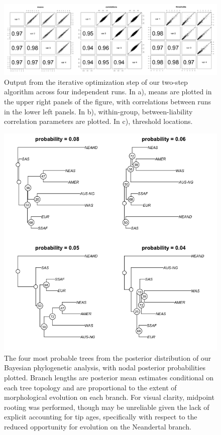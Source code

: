 \documentclass[12pt, twocolumn, twoside]{article}
\begin{document}
\begin{figure}[h]
\centering
\includegraphics[width=185mm]{figures/chpt4_figure3.png}
\caption{Output from the iterative optimization step of our two-step algorithm across four independent runs. In a), means are plotted in the upper right panels of the figure, with correlations between runs in the lower left panels. In b), within-group, between-liability correlation parameters are plotted. In c), threshold locations.  \label{overflow}}
\end{figure}

\begin{figure}[h]
\centering
\includegraphics[width=185mm]{figures/chpt4_figure4.png}
\caption{The four most probable trees from the posterior distribution of our Bayesian phylogenetic analysis, with nodal posterior probabilities plotted. Branch lengths are posterior mean estimates conditional on  each tree topology and are proportional to the extent of morphological evolution on each branch. For visual clarity, midpoint rooting was performed, though may be unreliable given the lack of explicit accounting for tip ages, specifically with respect to the reduced opportunity for evolution on the Neandertal branch.  \label{overflow}}
\end{figure}
\end{document}
